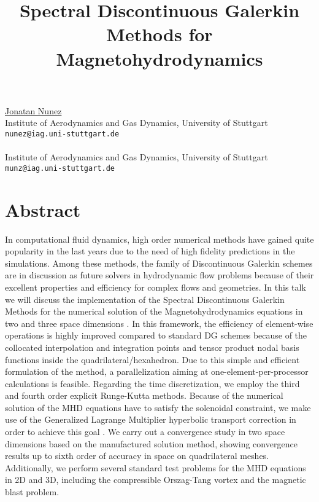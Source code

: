 \title{Spectral Discontinuous Galerkin Methods for Magnetohydrodynamics}
\author{}  \institute{}
\maketitle
\begin{center}
{\large \underline{Jonatan Nunez}}\\
Institute of Aerodynamics and Gas Dynamics, University of Stuttgart\\
{\tt nunez@iag.uni-stuttgart.de}
\\ \vspace{4mm}{\large Claus-Dieter Munz}\\
Institute of Aerodynamics and Gas Dynamics, University of Stuttgart\\
{\tt munz@iag.uni-stuttgart.de}

\end{center}

\section*{Abstract}

In computational fluid dynamics, high order numerical methods have gained quite popularity in the last years due to the need of high fidelity predictions in the simulations. Among these methods, the family of Discontinuous Galerkin schemes are in discussion as future solvers in hydrodynamic flow problems because of their excellent properties and efficiency for complex flows and geometries. In this talk we will discuss the implementation of the Spectral Discontinuous Galerkin Methods for the numerical solution of the Magnetohydrodynamics equations in two and three space dimensions \cite{canuto2006,kopriva2009}. In this framework, the efficiency of element-wise operations is highly improved compared to standard DG schemes because of the collocated interpolation and integration points and tensor product nodal basis functions inside the quadrilateral/hexahedron. Due to this simple and efficient formulation of the method, a parallelization aiming at one-element-per-processor calculations is feasible. Regarding the time discretization, we employ the third and fourth order explicit Runge-Kutta methods. Because of the numerical solution of the MHD equations have to satisfy the solenoidal constraint, we make use of the Generalized Lagrange Multiplier hyperbolic transport correction in order to achieve this goal \cite{dedner2002}. We carry out a convergence study in two space dimensions based on the manufactured solution method, showing convergence results up to sixth order of accuracy in space on quadrilateral meshes. Additionally, we perform several standard test problems for the MHD equations in 2D and 3D, including the compressible Orszag-Tang vortex and the magnetic blast problem.

